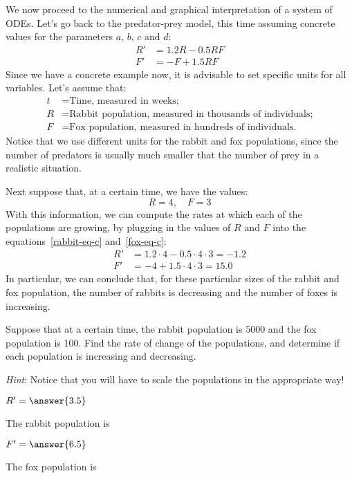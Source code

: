 \documentclass{ximera}
\begin{document}
We now proceed to the numerical and graphical interpretation of a system of ODEs. Let's go back to the predator-prey model, this time assuming concrete values for the parameters $a$, $b$, $c$ and $d$:
\begin{align}
\label{rabbit-eq-c}R'&=1.2R-0.5RF\\
\label{fox-eq-c}F'&=-F+1.5RF
\end{align}
Since we have a concrete example now, it is advisable to set specific units for all variables. Let's assume that:
\begin{align*}
t&=\text{Time, measured in weeks;}\\
R&=\text{Rabbit population, measured in thousands of individuals;}\\
F&=\text{Fox population, measured in hundreds of individuals.}
\end{align*}
Notice that we use different units for the rabbit and fox populations, since the number of predators is usually much smaller that the number of prey in a realistic situation.

Next suppose that, at a certain time, we have the values:
\[
R=4,\quad F=3
\]
With this information, we can compute the rates at which each of the populations are growing, by plugging in the values of $R$ and $F$ into the equations~\ref{rabbit-eq-c} and~\ref{fox-eq-c}:
\begin{align*}
R'&=1.2\cdot 4 - 0.5\cdot 4\cdot 3=-1.2\\
F'&=-4 + 1.5\cdot 4\cdot 3=15.0
\end{align*}
In particular, we can conclude that, for these particular sizes of the rabbit and fox population, the number of rabbits is decreasing and the number of foxes is increasing.

\begin{problem} Suppose that at a certain time, the rabbit population is  $5000$ and the fox population is $100$. Find the rate of change of the populations, and determine if each population is increasing and decreasing.

\emph{Hint}: Notice that you will have to scale the populations in the appropriate way!

\begin{question}
$R'= \answer{3.5}$

The rabbit population is 
\begin{multipleChoice}
\end{multipleChoice}
\end{question}
\begin{question}
$F'= \answer{6.5}$

The fox population is 
\begin{multipleChoice}
\end{multipleChoice}
\end{question}
\end{problem}
\end{document}

